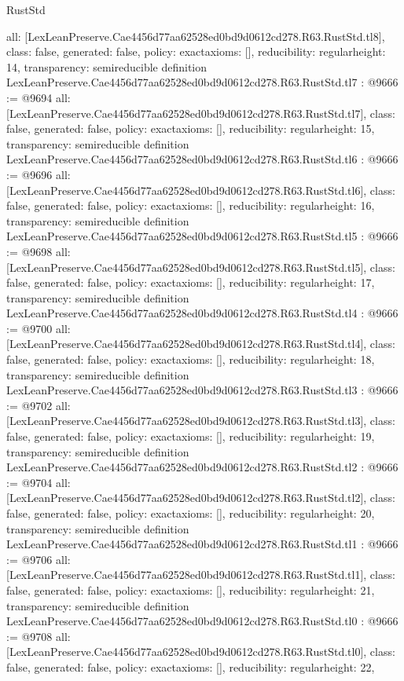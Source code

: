 \begin{lexlean}{RustStd}
\begin{coremodule}
{  all: [LexLeanPreserve.Cae4456d77aa62528ed0bd9d0612cd278.R63.RustStd.tl8],
  class: false,
  generated: false,
  policy: exact{axioms: []},
  reducibility: regular{height: 14},
  transparency: semireducible
}
definition LexLeanPreserve.Cae4456d77aa62528ed0bd9d0612cd278.R63.RustStd.tl7 : @9666 := @9694 {
  all: [LexLeanPreserve.Cae4456d77aa62528ed0bd9d0612cd278.R63.RustStd.tl7],
  class: false,
  generated: false,
  policy: exact{axioms: []},
  reducibility: regular{height: 15},
  transparency: semireducible
}
definition LexLeanPreserve.Cae4456d77aa62528ed0bd9d0612cd278.R63.RustStd.tl6 : @9666 := @9696 {
  all: [LexLeanPreserve.Cae4456d77aa62528ed0bd9d0612cd278.R63.RustStd.tl6],
  class: false,
  generated: false,
  policy: exact{axioms: []},
  reducibility: regular{height: 16},
  transparency: semireducible
}
definition LexLeanPreserve.Cae4456d77aa62528ed0bd9d0612cd278.R63.RustStd.tl5 : @9666 := @9698 {
  all: [LexLeanPreserve.Cae4456d77aa62528ed0bd9d0612cd278.R63.RustStd.tl5],
  class: false,
  generated: false,
  policy: exact{axioms: []},
  reducibility: regular{height: 17},
  transparency: semireducible
}
definition LexLeanPreserve.Cae4456d77aa62528ed0bd9d0612cd278.R63.RustStd.tl4 : @9666 := @9700 {
  all: [LexLeanPreserve.Cae4456d77aa62528ed0bd9d0612cd278.R63.RustStd.tl4],
  class: false,
  generated: false,
  policy: exact{axioms: []},
  reducibility: regular{height: 18},
  transparency: semireducible
}
definition LexLeanPreserve.Cae4456d77aa62528ed0bd9d0612cd278.R63.RustStd.tl3 : @9666 := @9702 {
  all: [LexLeanPreserve.Cae4456d77aa62528ed0bd9d0612cd278.R63.RustStd.tl3],
  class: false,
  generated: false,
  policy: exact{axioms: []},
  reducibility: regular{height: 19},
  transparency: semireducible
}
definition LexLeanPreserve.Cae4456d77aa62528ed0bd9d0612cd278.R63.RustStd.tl2 : @9666 := @9704 {
  all: [LexLeanPreserve.Cae4456d77aa62528ed0bd9d0612cd278.R63.RustStd.tl2],
  class: false,
  generated: false,
  policy: exact{axioms: []},
  reducibility: regular{height: 20},
  transparency: semireducible
}
definition LexLeanPreserve.Cae4456d77aa62528ed0bd9d0612cd278.R63.RustStd.tl1 : @9666 := @9706 {
  all: [LexLeanPreserve.Cae4456d77aa62528ed0bd9d0612cd278.R63.RustStd.tl1],
  class: false,
  generated: false,
  policy: exact{axioms: []},
  reducibility: regular{height: 21},
  transparency: semireducible
}
definition LexLeanPreserve.Cae4456d77aa62528ed0bd9d0612cd278.R63.RustStd.tl0 : @9666 := @9708 {
  all: [LexLeanPreserve.Cae4456d77aa62528ed0bd9d0612cd278.R63.RustStd.tl0],
  class: false,
  generated: false,
  policy: exact{axioms: []},
  reducibility: regular{height: 22},
}
\end{coremodule}
\end{lexlean}
